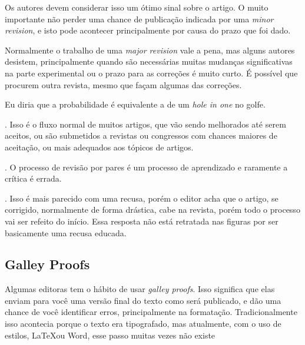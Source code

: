 \documentclass[openany]{book}
\begin{document}
 Os autores devem considerar isso um ótimo sinal sobre o artigo. O muito importante não perder uma chance de publicação indicada por uma \textit{minor revision}, e isto pode acontecer principalmente por causa do prazo que foi dado.

 Normalmente o trabalho de uma \textit{major revision} vale a pena, mas alguns autores desistem, principalmente quando são necessárias muitas mudanças significativas na parte experimental ou o prazo para as correções é muito curto. É possível que procurem outra revista, mesmo que façam algumas das correções.

 Eu diria que a probabilidade é equivalente a de um \textit{hole in one} no golfe.

. Isso é o fluxo normal de muitos artigos, que vão sendo melhorados até serem aceitos, ou são submetidos a revistas ou congressos com chances maiores de aceitação, ou mais adequados aos tópicos de artigos.

. O processo de revisão por pares é um processo de aprendizado e raramente a crítica é errada.


. Isso é mais parecido com uma recusa, porém o editor acha que o artigo, se corrigido, normalmente de forma drástica, cabe na revista, porém todo o processo vai ser refeito do início. Essa resposta não está retratada nas figuras por ser basicamente uma recusa educada.

\subsection{Galley Proofs}

Algumas editoras tem o hábito de usar \textit{galley proofs}. Isso significa que elas enviam para você uma versão final do texto como será publicado, e dão uma chance de você identificar erros, principalmente na formatação. Tradicionalmente isso acontecia porque o texto era tipografado, mas atualmente, com o uso de estilos, \LaTeX ou Word, esse passo muitas vezes não existe
\end{document}
